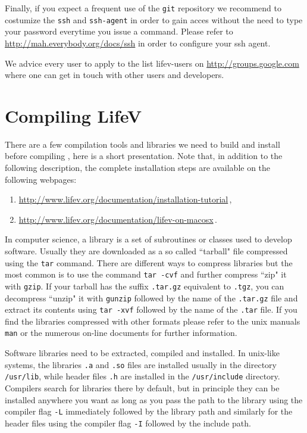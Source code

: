 Finally, if you expect a frequent use of the \verb!git! repository
we recommend to costumize the
\verb!ssh! and \verb!ssh-agent!
 in order to gain acces  without the need to type your password everytime you issue
a command. Please refer to \url{http://mah.everybody.org/docs/ssh} in order to configure
your ssh agent.

We advice every user to apply to the list lifev-users on \url{http://groups.google.com}
where one can get in touch with other users and developers.

\section{Compiling LifeV}
\label{compile-lifev}

There are a few compilation tools and libraries we need to build and install before
compiling \lifev, here is a short presentation. Note that, in addition to the following description, the complete installation steps are available on the following webpages:
\begin{enumerate}
\item \url{http://www.lifev.org/documentation/installation-tutorial}\,,
\item \url{http://www.lifev.org/documentation/lifev-on-macosx}\,.
\end{enumerate}



In computer science, a library is a set of subroutines or classes used to develop software.
Usually they are downloaded as a so called ``tarball" file
compressed using the \verb!tar! command. There are different ways to compress
libraries but the most common is to use the command \verb!tar -cvf! and further compress
``zip" it with \verb!gzip!. If your tarball has the suffix \verb!.tar.gz! equivalent to \verb!.tgz!,
you can decompress ``unzip" it with \verb!gunzip! followed by the name of the \verb!.tar.gz! file and
extract its contents using \verb!tar -xvf! followed by the name of the \verb!.tar! file.
If you find the libraries compressed with other formats
please refer to the unix manuals \verb!man! or the numerous
on-line documents for further information.

Software libraries need to be extracted, compiled and installed. In unix-like
systems, the libraries \verb!.a! and
\verb!.so! files are installed usually in the directory \verb!/usr/lib!,
 while header files
\verb!.h! are installed in the \verb!/usr/include! directory. Compilers search
for libraries there by default, but in principle they can be installed anywhere you want
as long as you pass the path to the library using the compiler flag \verb!-L! immediately
followed by the library path and similarly for the header files using the compiler
flag \verb!-I! followed by the include path.

